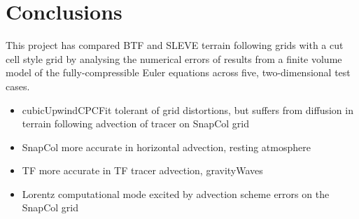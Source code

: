 \chapter{Conclusions}
This project has compared BTF and SLEVE terrain following grids with a cut cell style grid by analysing the numerical errors of results from a finite volume model of the fully-compressible Euler equations across five, two-dimensional test cases.

\begin{itemize}
\item cubicUpwindCPCFit tolerant of grid distortions, but suffers from diffusion in terrain following advection of tracer on SnapCol grid
\item SnapCol more accurate in horizontal advection, resting atmosphere
\item TF more accurate in TF tracer advection, gravityWaves
\item Lorentz computational mode excited by advection scheme errors on the SnapCol grid
\end{itemize}
